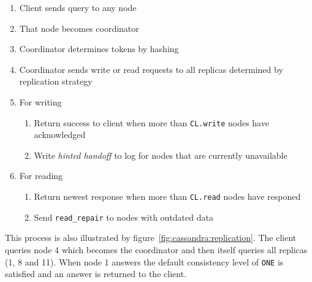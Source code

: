\begin{enumerate}
  \item Client sends query to any node
  \item That node becomes coordinator
  \item Coordinator determines tokens by hashing
  \item Coordinator sends write or read requests to all replicas determined by replication strategy
  \item For writing
    \begin{enumerate}
      \item Return success to client when more than \texttt{CL.write} nodes have acknowledged
      \item Write \textit{hinted handoff} to log for nodes that are currently unavailable
    \end{enumerate}
  \addtocounter{enumi}{-1}  %
  \item For reading
    \begin{enumerate}
      \item Return newest response when more than \texttt{CL.read} nodes have responed
      \item Send \texttt{read\_repair} to nodes with outdated data
    \end{enumerate}
\end{enumerate}

This process is also illustrated by figure~\ref{fig:cassandra:replication}.
The client queries node 4 which becomes the coordinator and then itself queries all replicas (1, 8 and 11).
When node 1 answers the default consistency level of \texttt{ONE} is satisfied and an answer is returned to the client.

